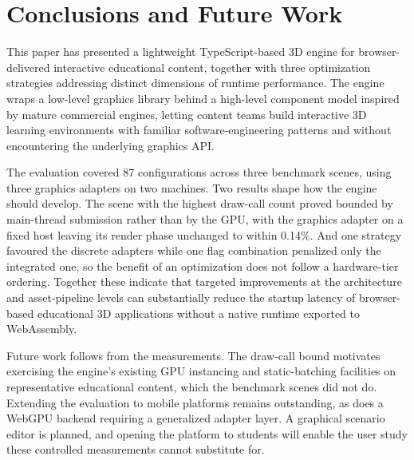 \section{Conclusions and Future Work}
\label{sec:conclusion}
This paper has presented a lightweight TypeScript-based 3D engine for browser-delivered interactive educational content, together with three optimization strategies addressing distinct dimensions of runtime performance. The engine wraps a low-level graphics library behind a high-level component model inspired by mature commercial engines, letting content teams build interactive 3D learning environments with familiar software-engineering patterns and without encountering the underlying graphics API.

The evaluation covered 87 configurations across three benchmark scenes, using three graphics adapters on two machines. Two results shape how the engine should develop. The scene with the highest draw-call count proved bounded by main-thread submission rather than by the GPU, with the graphics adapter on a fixed host leaving its render phase unchanged to within 0.14\%. And one strategy favoured the discrete adapters while one flag combination penalized only the integrated one, so the benefit of an optimization does not follow a hardware-tier ordering. Together these indicate that targeted improvements at the architecture and asset-pipeline levels can substantially reduce the startup latency of browser-based educational 3D applications without a native runtime exported to WebAssembly.

Future work follows from the measurements. The draw-call bound motivates exercising the engine's existing GPU instancing and static-batching facilities on representative educational content, which the benchmark scenes did not do. Extending the evaluation to mobile platforms remains outstanding, as does a WebGPU backend requiring a generalized adapter layer. A graphical scenario editor is planned, and opening the platform to students will enable the user study these controlled measurements cannot substitute for.